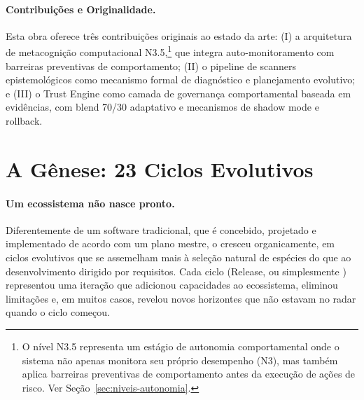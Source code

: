 \paragraph*{Contribuições e Originalidade.}
Esta obra oferece três contribuições originais ao estado da arte:
(I) a arquitetura de metacognição computacional N3.5,\footnote{O
nível N3.5 representa um estágio de autonomia comportamental onde
o sistema não apenas monitora seu próprio desempenho (N3), mas
também aplica barreiras preventivas de comportamento antes da
execução de ações de risco. Ver Seção~\ref{sec:niveis-autonomia}.}
que integra auto-monitoramento com barreiras preventivas de
comportamento; (II) o pipeline de scanners epistemológicos como
mecanismo formal de diagnóstico e planejamento evolutivo; e
(III) o Trust Engine como camada de governança comportamental
baseada em evidências, com blend 70/30 adaptativo e mecanismos
de shadow mode e rollback.

\section{A Gênese: 23 Ciclos Evolutivos}

\paragraph*{Um ecossistema não nasce pronto.} Diferentemente de um software
tradicional, que é concebido, projetado e implementado de acordo com um
plano mestre, o \opencodeeco{} cresceu organicamente, em ciclos evolutivos
que se assemelham mais à seleção natural de espécies do que ao
desenvolvimento dirigido por requisitos. Cada ciclo (Release, ou simplesmente
) representou uma iteração que adicionou capacidades ao
ecossistema, eliminou limitações e, em muitos casos, revelou novos horizontes
que não estavam no radar quando o ciclo começou.

